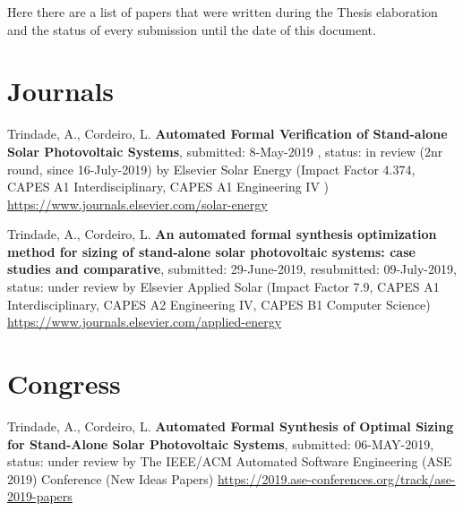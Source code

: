 %
Here there are a list of papers that were written during the Thesis elaboration and the status of every submission until the date of this document.

\section{Journals}

Trindade, A., Cordeiro, L. \textbf{Automated Formal Verification of Stand-alone Solar Photovoltaic Systems}, submitted: 8-May-2019 , status: in review (2nr round, since 16-July-2019) by Elsevier Solar Energy (Impact Factor 4.374, CAPES A1 Interdisciplinary, CAPES A1 Engineering IV ) \url{https://www.journals.elsevier.com/solar-energy}

Trindade, A., Cordeiro, L. \textbf{An automated formal synthesis optimization method for sizing of stand-alone solar photovoltaic systems: case studies and comparative}, submitted: 29-June-2019, resubmitted: 09-July-2019, status: under review by Elsevier Applied Solar (Impact Factor 7.9, CAPES A1 Interdisciplinary, CAPES A2 Engineering IV, CAPES B1 Computer Science) \url{https://www.journals.elsevier.com/applied-energy}


\section{Congress}

Trindade, A., Cordeiro, L. \textbf{Automated Formal Synthesis of Optimal Sizing for Stand-Alone Solar Photovoltaic Systems}, submitted: 06-MAY-2019, status: under review by The IEEE/ACM Automated Software Engineering (ASE 2019) Conference (New Ideas Papers) \url{https://2019.ase-conferences.org/track/ase-2019-papers}